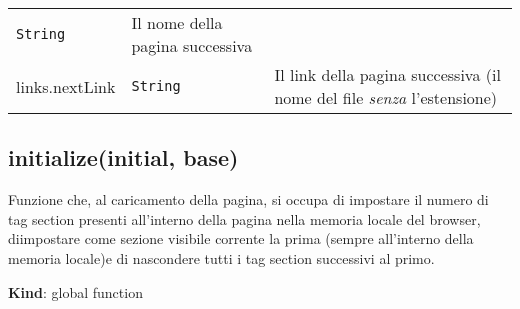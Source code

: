 \begin{tabularx}{\textwidth}{XXX}
\begin{minipage}[t]{0.30\columnwidth}
\texttt{String}\strut
\end{minipage} & \begin{minipage}[t]{0.30\columnwidth}\raggedright
Il nome della pagina successiva\strut
\end{minipage}\tabularnewline
\begin{minipage}[t]{0.30\columnwidth}\raggedright
links.nextLink\strut
\end{minipage} & \begin{minipage}[t]{0.30\columnwidth}\raggedright
\texttt{String}\strut
\end{minipage} & \begin{minipage}[t]{0.30\columnwidth}\raggedright
Il link della pagina successiva (il nome del file \emph{senza}
l'estensione)\strut
\end{minipage}\tabularnewline
\bottomrule
\end{tabularx}

\protect\hypertarget{initialize}{}{}

\hypertarget{initializeinitial-base}{%
\subsection{initialize(initial, base)}\label{initializeinitial-base}}

Funzione che, al caricamento della pagina, si occupa di impostare il
numero di tag section presenti all'interno della pagina nella memoria
locale del browser, diimpostare come sezione visibile corrente la prima
(sempre all'interno della memoria locale)e di nascondere tutti i tag
section successivi al primo.

\textbf{Kind}: global function

